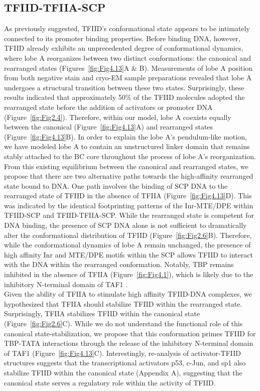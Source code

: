 \subsection{TFIID-TFIIA-SCP}

As previously suggested, TFIID's conformational state appears to be intimately connected to its promoter binding properties. Before binding DNA, however, TFIID already exhibits an unprecedented degree of conformational dynamics, where lobe A reorganizes between two distinct conformations: the canonical and rearranged states (Figures~\ref{fig:Fig4.13}A \& B). Measurements of lobe A position from both negative stain and cryo-EM sample preparations revealed that lobe A undergoes a structural transition between these two states. Surprisingly, these results indicated that approximately 50\% of the TFIID molecules adopted the rearranged state before the addition of activators or promoter DNA  (Figure~\ref{fig:Fig2.4}). Therefore, within our model, lobe A coexists equally between the canonical (Figure~\ref{fig:Fig4.13}A) and rearranged states (Figure~\ref{fig:Fig4.13}B). In order to explain the lobe A's pendulum-like motion, we have modeled lobe A to contain an unstructured linker domain that remains stably attached to the BC core throughout the process of lobe A's reorganization. \\
\indent From this existing equilibrium between the canonical and rearranged states, we propose that there are two alternative paths towards the high-affinity rearranged state bound to DNA. One path involves the binding of SCP DNA to the rearranged state of TFIID in the absence of TFIIA (Figure~\ref{fig:Fig4.13}D). This was indicated by the identical footprinting patterns of the Inr-MTE/DPE within TFIID-SCP and TFIID-TFIIA-SCP. While the rearranged state is competent for DNA binding, the presence of SCP DNA alone is not sufficient to dramatically alter the conformational distribution of TFIID (Figure~\ref{fig:Fig2.6}B). Therefore, while the conformational dynamics of lobe A remain unchanged, the presence of high affinity Inr and MTE/DPE motifs within the SCP allows TFIID to interact with the DNA within the rearranged conformation.  Notably, TBP remains inhibited in the absence of TFIIA (Figure~\ref{fig:Fig4.1}), which is likely due to the inhibitory N-terminal domain of TAF1 \cite{Bagby_2202,Geiger_2949,Liu_2574}. \\
\indent Given the ability of TFIIA to stimulate high affinity TFIID-DNA complexes, we hypothesized that TFIIA should stabilize TFIID within the rearranged state. Surprisingly, TFIIA stabilizes TFIID within the canonical state (Figure~\ref{fig:Fig2.6}C). While we do not understand the functional role of this canonical state-stabilization, we propose that this conformation primes TFIID for TBP-TATA interactions through the release of the inhibitory N-terminal domain of TAF1 (Figure~\ref{fig:Fig4.13}C). Interestingly, re-analysis of activator-TFIID structures suggests that the transcriptional activators p53, c-Jun, and sp1 also stabilize TFIID within the canonical state (Appendix A), suggesting that the canonical state serves a regulatory role within the activity of TFIID.\\

